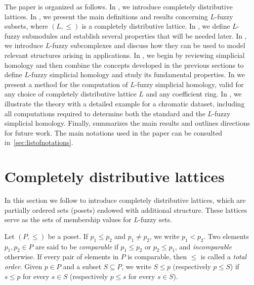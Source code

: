\documentclass[a4paper,10pt]{article}
\begin{document}
The paper is organized as follows. In , we introduce  completely distributive lattices. In , we present the main definitions and results concerning \(L\)-fuzzy subsets, where \((L,\leq)\) is a completely distributive lattice.  In , we define \(L\)-fuzzy submodules and establish several properties that will be needed later. In , we introduce \(L\)-fuzzy subcomplexes and discuss how they can be used to model relevant structures arising in applications. In , we begin by reviewing  simplicial homology and then combine the concepts developed in the previous sections to define \(L\)-fuzzy simplicial homology and study its fundamental properties. In  we present a method for the computation of \(L\)-fuzzy simplicial homology, valid for any choice of completely distributive lattice \(L\) and any coefficient ring. In , we illustrate the theory with a detailed example for a chromatic dataset, including all computations required to determine both the standard and the \(L\)-fuzzy simplicial homology. Finally,  summarizes the main results and outlines directions for future work.
The main notations used in the paper can be consulted in~\ref{sec:listofnotations}.

\section{Completely distributive lattices}
\label{sec:cdl}

In this section we follow \cite{davey2002introduction} to introduce completely distributive lattices, which are partially ordered sets (posets) endowed with additional structure. These lattices serve as the sets of membership values for \(L\)-fuzzy sets.

Let \((P,\leq)\) be a poset. If \(p_1 \leq p_2\) and \(p_1 \neq p_2\), we write \(p_1 < p_2\). Two elements \(p_1, p_2 \in P\) are said to be \emph{comparable} if \(p_1 \leq p_2\) or \(p_2 \leq p_1\), and \emph{incomparable} otherwise. If every pair of elements in \(P\) is comparable, then \(\leq\) is called a \emph{total order}. Given \(p \in P\) and a subset \(S \subseteq P\), we write \(S \leq p\) (respectively \(p \leq S\)) if \(s \leq p\) for every \(s \in S\) (respectively \(p \leq s\) for every \(s \in S\)). 
\end{document}
